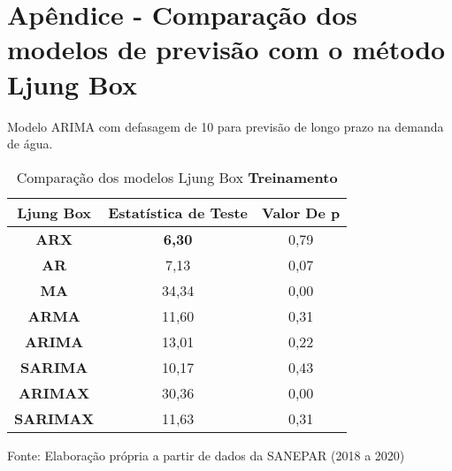 
\section{Ap\^endice - Compara\c c\~ao dos modelos de previs\~ao com o m\'etodo Ljung Box}\label{sec:comtb18}



Modelo ARIMA com defasagem de 10 para previsão de longo prazo na demanda de água.

	\begin{table}[H]
		\centering
		\caption{Comparação dos modelos Ljung Box \textbf{Treinamento} }\label{tb:lbtrn}
	\begin{tabular}{@{}ccc@{}}
		\toprule
		\textbf{Ljung Box} & \textbf{Estatística de Teste} & \textbf{Valor De p} \\ \midrule
\textbf{ARX}       & \textbf{6,30}                          & 0,79                \\
\textbf{AR}        & 7,13                          & 0,07                \\
\textbf{MA}        & 34,34                         & 0,00                \\
\textbf{ARMA}      & 11,60                         & 0,31                \\
\textbf{ARIMA}     & 13,01                         & 0,22                \\
\textbf{SARIMA}    & 10,17                         & 0,43                \\
\textbf{ARIMAX}    & 30,36                         & 0,00                \\
\textbf{SARIMAX}   & 11,63                         & 0,31                \\ \bottomrule
	\end{tabular}

Fonte: Elaboração própria a partir de dados da SANEPAR (2018 a 2020)
	\end{table}

